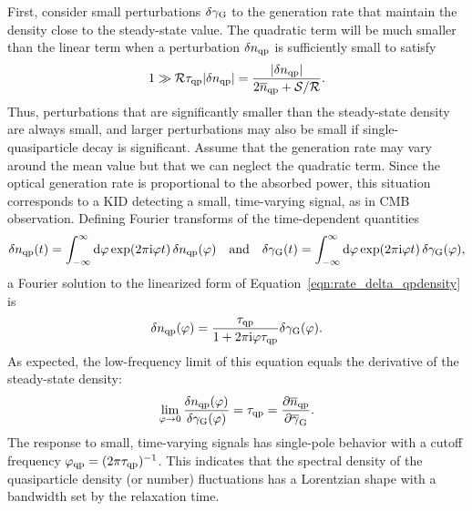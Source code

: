 First, consider small perturbations $\delta\gamma_{\mathrm{G}}$ to the generation rate that maintain the density close to the steady-state value.
The quadratic term will be much smaller than the linear term when a perturbation $\delta n_{\mathrm{qp}}$ is sufficiently small to satisfy
\begin{equation}
1
  \gg
  \mathcal{R} \tau_{\mathrm{qp}} |\delta n_{\mathrm{qp}}|
  =
  \frac{|\delta n_{\mathrm{qp}}|}{2 \overline{n}_{\mathrm{qp}} + \mathcal{S} / \mathcal{R}}.
\end{equation}
Thus, perturbations that are significantly smaller than the steady-state density are always small, and larger perturbations may also be small if single-quasiparticle decay is significant.
Assume that the generation rate may vary around the mean value but that we can neglect the quadratic term.
Since the optical generation rate is proportional to the absorbed power, this situation corresponds to a KID detecting a small, time-varying signal, as in CMB observation.
Defining Fourier transforms of the time-dependent quantities
\begin{equation}
\delta\qpdensity(\time)
  =
  \int_{-\infty}^\infty \dd{\faudio}
  \exp(2 \pi \I \faudio \time) \, \delta\qpdensity(\faudio)
  \qqtext{and}
\delta\rate_\generation(\time)
  =
  \int_{-\infty}^\infty \dd{\faudio}
  \exp(2 \pi \I \faudio \time) \, \delta\rate_\generation(\faudio),
\end{equation}
a Fourier solution to the linearized form of Equation~\ref{eqn:rate_delta_qpdensity} is
\begin{equation}
\delta n_{\mathrm{qp}}(\varphi)
  =
  \frac{\tau_{\mathrm{qp}}}{1 + 2 \pi \mathrm{i} \varphi \tau_{\mathrm{qp}}} \delta\gamma_{\mathrm{G}}(\varphi).
\label{eqn:delta_qpdensity_frequency}
\end{equation}
As expected, the low-frequency limit of this equation equals the derivative of the steady-state density:
\begin{equation}
\lim_{\varphi \rightarrow 0} \frac{\delta n_{\mathrm{qp}}(\varphi)}{\delta\gamma_{\mathrm{G}}(\varphi)}
  =
  \tau_{\mathrm{qp}}
  =
  \pdv{\overline{n}_{\mathrm{qp}}}{\overline{\gamma}_{\mathrm{G}}}.
\end{equation}
The response to small, time-varying signals has single-pole behavior with a cutoff frequency 
$\varphi_{\mathrm{qp}} = (2 \pi \tau_{\mathrm{qp}})^{-1}$.
This indicates that the spectral density of the quasiparticle density (or number) fluctuations has a Lorentzian shape with a bandwidth set by the relaxation time.

